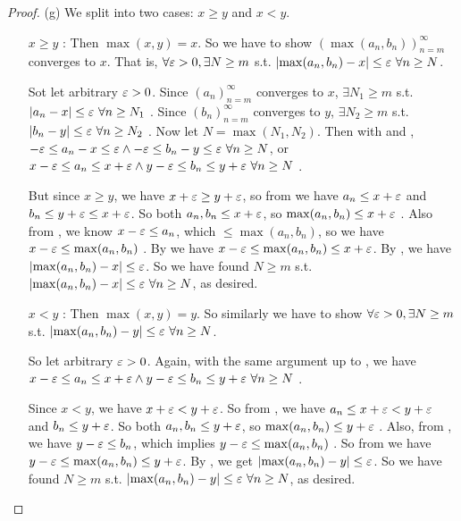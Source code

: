 \begin{proof}(g)
We split into two cases: \(x \ge y\) and \(x < y\).
\begin{itemize}
\item[\(x \ge y\)]: Then \(\max(x, y) = x\).
    So we have to show \((\max(a_n, b_n))_{n = m}^{\infty}\) converges to \(x\).
    That is, \(\forall \varepsilon > 0, \exists N \ge m\) s.t. \(\abs{\max(a_n, b_n) - x} \le \varE\ \forall n \ge N\).
    
    Sot let arbitrary \(\varepsilon > 0\).
    Since \((a_n)_{n = m}^{\infty}\) converges to \(x\), \(\exists N_1 \ge m\) s.t. \(\lvert a_n - x\rvert \le \varepsilon\ \forall n \ge N_1\) \MAROON{(*)}.
    Since \((b_n)_{n = m}^{\infty}\) converges to \(y\), \(\exists N_2 \ge m\) s.t. \(\lvert b_n - y\rvert \le \varepsilon\ \forall n \ge N_2\) \MAROON{(**)}.
    Now let \(N = \max(N_1, N_2)\).
    Then with \MAROON{(*)(**)} and , \(-\varepsilon \le a_n - x \le \varepsilon \land -\varepsilon \le b_n - y \le \varepsilon\ \forall n \ge N\),
    or \(x - \varepsilon \le a_n \le x + \varepsilon \land y -\varepsilon \le b_n \le y + \varepsilon\ \forall n \ge N\) \MAROON{(***)}.
    
    But since \(x \ge y\), we have \(x + \varepsilon \ge y + \varepsilon\), so from \MAROON{(***)} we have \(a_n \le x + \varepsilon\) and \(b_n \le y + \varepsilon \le x + \varepsilon\).
    So both \(a_n, b_n \le x + \varepsilon\), so \(\max(a_n, b_n) \le x + \varepsilon\) \BLUE{(*)}.
    Also from \MAROON{(***)}, we know \(x - \varepsilon \le a_n\), which \(\le \max(a_n, b_n)\), so we have \(x - \varepsilon \le \max(a_n, b_n)\) \BLUE{(**)}.
    By \BLUE{(*)(**)} we have \(x - \varepsilon \le \max(a_n, b_n) \le x + \varepsilon\).
    By , we have \(\lvert\max(a_n, b_n) - x\rvert \le \varepsilon\).
    So we have found \(N \ge m\) s.t. \(\abs{\max(a_n, b_n) - x} \le \varE\ \forall n \ge N\), as desired.
\item[\(x < y\)]: Then \(\max(x, y) = y\).
    So similarly we have to show \(\forall \varepsilon > 0, \exists N \ge m\) s.t. \(\abs{\max(a_n, b_n) - y} \le \varE\ \forall n \ge N\).
    
    So let arbitrary \(\varepsilon > 0\).
    Again, with the same argument up to \MAROON{(***)}, we have \(x - \varepsilon \le a_n \le x + \varepsilon \land y -\varepsilon \le b_n \le y + \varepsilon\ \forall n \ge N\) \MAROON{(****)}.
    
    Since \(x < y\), we have \(x + \varepsilon < y + \varepsilon\).
    So from \MAROON{(****)}, we have \(a_n \le x + \varepsilon < y + \varepsilon\) and \(b_n \le y + \varepsilon\).
    So both \(a_n, b_n \le y + \varepsilon\), so \(\max(a_n, b_n) \le y + \varepsilon\) \BLUE{(***)}.
    Also, from \MAROON{(****)}, we have \(y - \varepsilon \le b_n\), which implies \(y - \varepsilon \le \max(a_n, b_n)\) \BLUE{(****)}.
    So from \BLUE{(***)(****)} we have \(y - \varepsilon \le \max(a_n, b_n) \le y + \varepsilon\).
    By , we get \(\lvert\max(a_n, b_n) - y\rvert \le \varepsilon\).
    So we have found \(N \ge m\) s.t. \(\abs{\max(a_n, b_n) - y} \le \varE\ \forall n \ge N\), as desired.
\end{itemize}
\end{proof}

